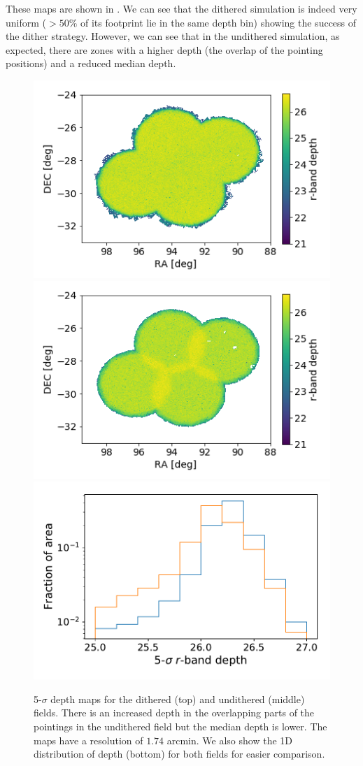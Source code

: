 \documentclass[\docopts]{\docclass}
\begin{document}
These maps are shown in . We can see that the dithered simulation is indeed very uniform ($> 50\%$ of its footprint lie in the same depth bin) showing the success of the dither strategy. However, we can see that in the undithered simulation, as expected, there are zones with a higher depth (the overlap of the pointing positions) and a reduced median depth.
\begin{figure}
\centering
\includegraphics[width=0.85\columnwidth]{dithered_depth.png}
\includegraphics[width=0.85\columnwidth]{undithered_depth.png}
\includegraphics[width=0.85\columnwidth]{depth_comparison_1d.pdf}
\caption{5-$\sigma$ depth maps for the dithered (top) and undithered (middle) fields. There is an increased depth in the overlapping parts of the pointings in the undithered field but the median depth is lower. The maps have a resolution of $1.74$ arcmin. We also show the 1D distribution of depth (bottom) for both fields for easier comparison.}
\label{fig:depth_maps}
\end{figure}
\end{document}

